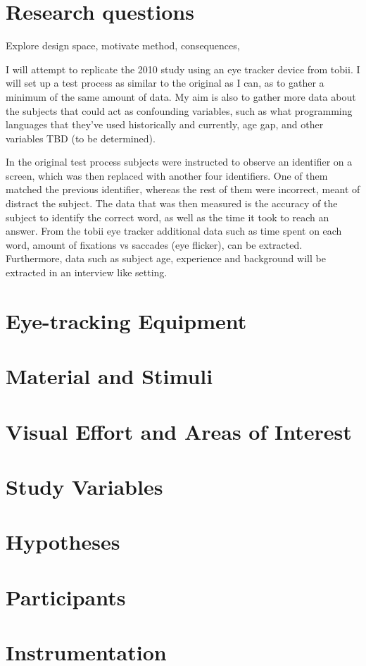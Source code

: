 \iffalse
\begin{itemize}
	\item How to measure simplicity and scalability
	\item Not just what you did but why and what the consequences are
\end{itemize}
\fi

\section{Research questions}
Explore design space, motivate method, consequences, 


I will attempt to replicate the 2010 study using an eye tracker device from tobii. I will set up a test process as similar to the original as I can, as to gather a minimum of the same amount of data. My aim is also to gather more data about the subjects that could act as confounding variables, such as what programming languages that they've used historically and currently, age gap, and other variables TBD (to be determined).

In the original test process subjects were instructed to observe an identifier on a screen, which was then replaced with another four identifiers. One of them matched the previous identifier, whereas the rest of them were incorrect, meant of distract the subject. The data that was then measured is the accuracy of the subject to identify the correct word, as well as the time it took to reach an answer. From the tobii eye tracker additional data such as time spent on each word, amount of fixations vs saccades (eye flicker), can be extracted.
Furthermore, data such as subject age, experience and background will be extracted in an interview like setting.

\section{Eye-tracking Equipment}

\section{Material and Stimuli}

\section{Visual Effort and Areas of Interest}

\section{Study Variables}

\section{Hypotheses}

\section{Participants}

\section{Instrumentation}